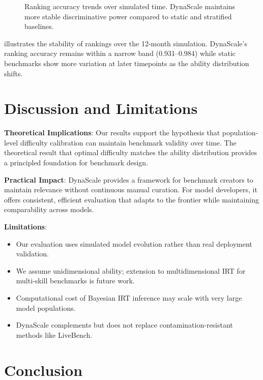 \documentclass{article}
\begin{document}
\begin{figure}[t]
\centering
{}
\caption{Ranking accuracy trends over simulated time. DynaScale maintains more stable discriminative power compared to static and stratified baselines.}
\label{fig:stability}
\end{figure}

 illustrates the stability of rankings over the 12-month simulation. DynaScale's ranking accuracy remains within a narrow band (0.931--0.984) while static benchmarks show more variation at later timepoints as the ability distribution shifts.

\section{Discussion and Limitations}
\label{sec:discussion}

\textbf{Theoretical Implications}: Our results support the hypothesis that population-level difficulty calibration can maintain benchmark validity over time. The theoretical result that optimal difficulty matches the ability distribution provides a principled foundation for benchmark design.

\textbf{Practical Impact}: DynaScale provides a framework for benchmark creators to maintain relevance without continuous manual curation. For model developers, it offers consistent, efficient evaluation that adapts to the frontier while maintaining comparability across models.

\textbf{Limitations}:
\begin{itemize}
    \item Our evaluation uses simulated model evolution rather than real deployment validation.
    \item We assume unidimensional ability; extension to multidimensional IRT for multi-skill benchmarks is future work.
    \item Computational cost of Bayesian IRT inference may scale with very large model populations.
    \item DynaScale complements but does not replace contamination-resistant methods like LiveBench.
\end{itemize}

\section{Conclusion}
\label{sec:conclusion}
\end{document}
